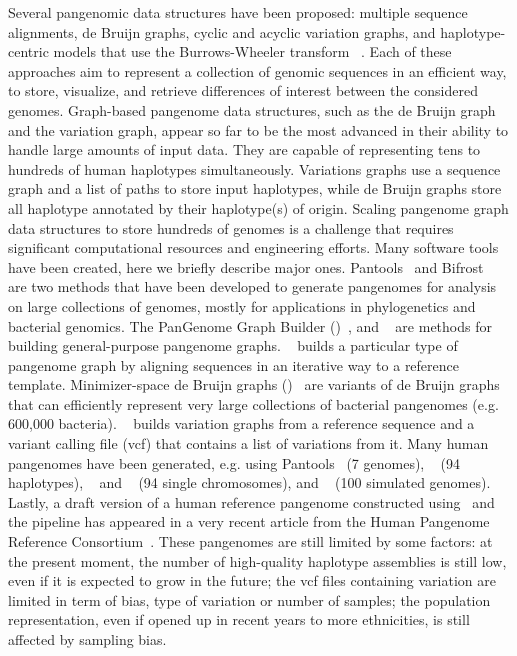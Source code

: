 Several pangenomic data structures have been proposed: multiple sequence alignments, de Bruijn graphs, cyclic and acyclic variation graphs, and haplotype-centric models that use the Burrows-Wheeler transform ~\cite{computational_pangenomics}. Each of these approaches aim to represent a collection of genomic sequences in an efficient way, to store, visualize, and retrieve differences of interest between the considered genomes. 
Graph-based pangenome data structures, such as the de Bruijn graph and the variation graph, appear so far to be the most advanced in their ability to handle large amounts of input data. They are capable of representing tens to hundreds of human haplotypes simultaneously. Variations graphs use a sequence graph and a list of paths to store input haplotypes, while de Bruijn graphs store all haplotype \kmers annotated by their haplotype(s) of origin. 
Scaling pangenome graph data structures to store hundreds of genomes is a challenge that requires significant computational resources and engineering efforts. Many software tools have been created, here we briefly describe major ones.
Pantools~\cite{pantools} and Bifrost~\cite{bifrost} are two methods that have been developed to generate pangenomes for analysis on large collections of genomes, mostly for applications in phylogenetics and bacterial genomics. The PanGenome Graph Builder (\pggb)~\cite{pggb}, \mcactus and \twopaco~\cite{twopaco} are methods for building general-purpose pangenome graphs. \minigraph~\cite{minigraph} builds a particular type of pangenome graph by aligning sequences in an iterative way to a reference template. Minimizer-space de Bruijn graphs (\mdbg)~\cite{mdbg} are variants of de Bruijn graphs that can efficiently represent very large collections of bacterial pangenomes (e.g. 600,000 bacteria).  \mbox{\vg}~\mbox{\cite{vg}} builds variation graphs from a reference sequence and a variant calling file (vcf) that contains a list of variations from it.
Many human pangenomes have been generated, e.g. using Pantools~\cite{pantools} (7 genomes),  \minigraph~\cite{minigraph} (94 haplotypes), \mcactus~\cite{cactus,mcactus} and \pggb~\cite{hdpr} (94 single chromosomes), and \twopaco~\cite{twopaco} (100 simulated genomes). Lastly, a draft version of a human reference pangenome constructed using \pggb\ and the \mcactus pipeline has appeared in a very recent article from the Human Pangenome Reference Consortium~\cite{hdpr}.
These pangenomes are still limited by some factors: at the present moment, the number of high-quality haplotype assemblies is still low, even if it is expected to grow in the future; the vcf files containing variation are limited in term of bias, type of variation or number of samples; the population representation, even if opened up in recent years to more ethnicities, is still affected by sampling bias.

